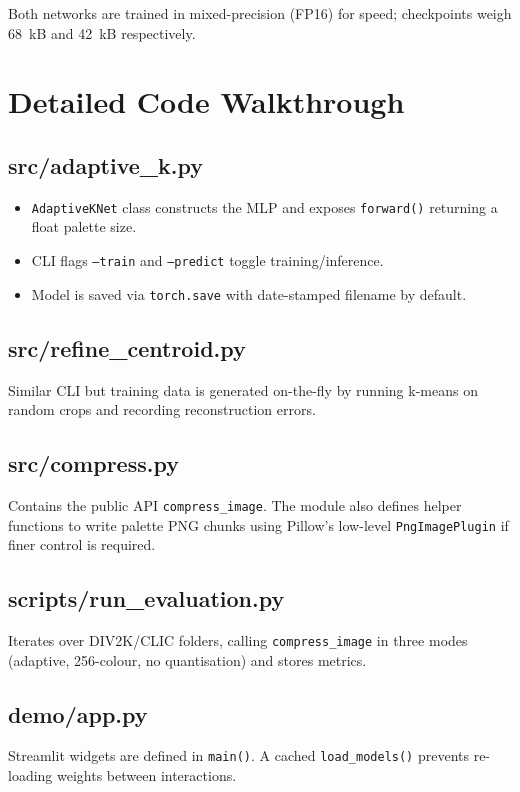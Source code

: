 \documentclass[11pt]{article}
\begin{document}
Both networks are trained in mixed-precision (FP16) for speed; checkpoints weigh 68~kB and 42~kB respectively.

\section{Detailed Code Walkthrough}
\subsection{src/adaptive\_k.py}
\begin{itemize}
  \item \texttt{AdaptiveKNet} class constructs the MLP and exposes \texttt{forward()} returning a float palette size.
  \item CLI flags \texttt{--train} and \texttt{--predict} toggle training/inference.
  \item Model is saved via \texttt{torch.save} with date-stamped filename by default.
\end{itemize}

\subsection{src/refine\_centroid.py}
Similar CLI but training data is generated on-the-fly by running k-means on random crops and recording reconstruction errors.

\subsection{src/compress.py}
Contains the public API \texttt{compress\_image}. The module also defines helper functions to write palette PNG chunks using Pillow's low-level \texttt{PngImagePlugin} if finer control is required.

\subsection{scripts/run\_evaluation.py}
Iterates over DIV2K/CLIC folders, calling \texttt{compress\_image} in three modes (adaptive, 256-colour, no quantisation) and stores metrics.

\subsection{demo/app.py}
Streamlit widgets are defined in \texttt{main()}. A cached \texttt{load\_models()} prevents re-loading weights between interactions.
\end{document}
